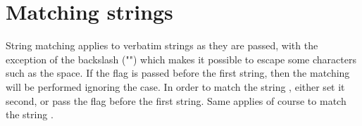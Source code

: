 
\section{Matching strings}

String matching applies to verbatim strings as they are passed, with the
exception of the backslash ("\bslash ") which makes it possible to escape some
characters such as the space. If the  flag is passed before the first
string, then the matching will be performed ignoring the case. In order
to match the string , either set it second, or pass the \cmdarg{--} flag
before the first string. Same applies of course to match the string \cmdarg{--}.

